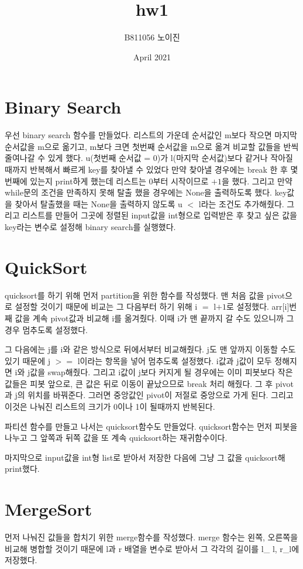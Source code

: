 \documentclass{article}
\begin{document}
\title{hw1}
\author{B811056 노이진}
\date{April 2021}
\maketitle

\section{Binary Search}
우선 binary search 함수를 만들었다. 리스트의 가운데 순서값인 m보다 작으면 마지막 순서값을 m으로 옮기고, m보다 크면 첫번째 순서값을 m으로 옮겨 비교할 값들을 반씩 줄여나갈 수 있게 했다. u(첫번째 순서값 = 0)가 l(마지막 순서값)보다 같거나 작아질 때까지 반복해서 빠르게 key를 찾아낼 수 있었다 만약 찾아낼 경우에는 break 한 후 몇 번째에 있는지 print하게 했는데 리스트는 0부터 시작이므로 $+1$을 했다. 그리고 만약 while문의 조건을 만족하지 못해 탈출 했을 경우에는 None을 출력하도록 했다. key값을 찾아서 탈출했을 때는 None을 출력하지 않도록 u $<$ l라는 조건도 추가해줬다.
그리고 리스트를 만들어 그곳에 정렬된 input값을 int형으로 입력받은 후 찾고 싶은 값을 key라는 변수로 설정해 binary search를 실행했다.
\section{QuickSort}
quicksort를 하기 위해 먼저 partition을 위한 함수를 작성했다. 맨 처음 값을 pivot으로 설정할 것이기 때문에 비교는 그 다음부터 하기 위해 i $=$ l$+1$로 설정했다. arr[i]번째 값을 계속 pivot값과 비교해 i를 옮겨줬다. 이때 i가 맨 끝까지 갈 수도 있으니까 그 경우 멈추도록 설정했다.

그 다음에는 j를 i와 같은 방식으로 뒤에서부터 비교해줬다. j도 맨 앞까지 이동할 수도 있기 때문에 j $>=$ l이라는 항목을 넣어 멈추도록 설정했다. i값과 j값이 모두 정해지면 i와 j값을 swap해줬다. 그리고 i값이 j보다 커지게 될 경우에는 이미 피봇보다 작은 값들은 피봇 앞으로, 큰 값은 뒤로 이동이 끝났으므로 break 처리 해줬다. 그 후 pivot과 j의 위치를 바꿔준다. 그러면 중앙값인 pivot이 저절로 중앙으로 가게 된다. 그리고 이것은 나눠진 리스트의 크기가 0이나 1이 될때까지 반복된다.

파티션 함수를 만들고 나서는 quicksort함수도 만들었다. quicksort함수는 먼저 피봇을 나누고 그 앞쪽과 뒤쪽 값을 또 계속 quicksort하는 재귀함수이다. 

마지막으로 input값을 int형 list로 받아서 저장한 다음에 그냥 그 값을 quicksort해 print했다.
\section{MergeSort}
먼저 나눠진 값들을 합치기 위한 merge함수를 작성했다. merge 함수는 왼쪽, 오른쪽을 비교해 병합할 것이기 때문에 l과 r 배열을 변수로 받아서 그 각각의 길이를 l\_ l, r\_l에 저장했다.
\end{document}

